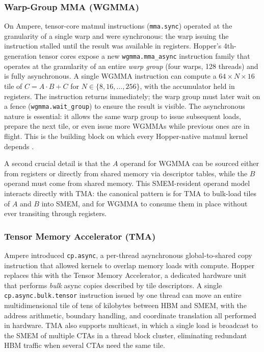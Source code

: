 \documentclass[10pt]{article}
\begin{document}
\subsubsection{Warp-Group MMA (WGMMA)}
On Ampere, tensor-core matmul instructions (\texttt{mma.sync}) operated at the granularity of a single warp and were synchronous: the warp issuing the instruction stalled until the result was available in registers. Hopper's 4th-generation tensor cores expose a new \texttt{wgmma.mma\_async} instruction family that operates at the granularity of an entire \emph{warp group} (four warps, 128 threads) and is fully asynchronous. A single WGMMA instruction can compute a $64 \times N \times 16$ tile of $C = A \cdot B + C$ for $N \in \{8, 16, \ldots, 256\}$, with the accumulator held in registers. The instruction returns immediately; the warp group must later wait on a fence (\texttt{wgmma.wait\_group}) to ensure the result is visible. The asynchronous nature is essential: it allows the same warp group to issue subsequent loads, prepare the next tile, or even issue more WGMMAs while previous ones are in flight. This is the building block on which every Hopper-native matmul kernel depends \citep{thakkar2023cutlass,shah2024flashattention3}.

A second crucial detail is that the $A$ operand for WGMMA can be sourced either from registers or directly from shared memory via descriptor tables, while the $B$ operand must come from shared memory. This SMEM-resident operand model interacts directly with TMA: the canonical pattern is for TMA to bulk-load tiles of $A$ and $B$ into SMEM, and for WGMMA to consume them in place without ever transiting through registers.

\subsubsection{Tensor Memory Accelerator (TMA)}
Ampere introduced \texttt{cp.async}, a per-thread asynchronous global-to-shared copy instruction that allowed kernels to overlap memory loads with compute. Hopper replaces this with the Tensor Memory Accelerator, a dedicated hardware unit that performs \emph{bulk} async copies described by tile descriptors. A single \texttt{cp.async.bulk.tensor} instruction issued by one thread can move an entire multidimensional tile of tens of kilobytes between HBM and SMEM, with the address arithmetic, boundary handling, and coordinate translation all performed in hardware. TMA also supports multicast, in which a single load is broadcast to the SMEM of multiple CTAs in a thread block cluster, eliminating redundant HBM traffic when several CTAs need the same tile.
\end{document}
